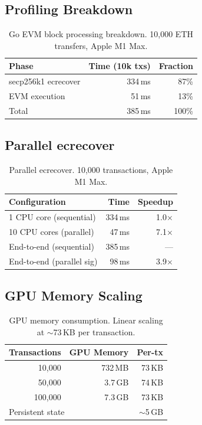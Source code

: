 \subsection{Profiling Breakdown}

\begin{table}[h]
\centering
\small
\begin{tabular}{lrr}
\toprule
\textbf{Phase} & \textbf{Time (10k txs)} & \textbf{Fraction} \\
\midrule
secp256k1 ecrecover & 334\,ms & 87\% \\
EVM execution       & 51\,ms  & 13\% \\
\midrule
Total               & 385\,ms & 100\% \\
\bottomrule
\end{tabular}
\caption{Go EVM block processing breakdown. 10{,}000 ETH transfers, Apple M1 Max.}
\label{tab:profile}
\end{table}

\subsection{Parallel ecrecover}

\begin{table}[h]
\centering
\small
\begin{tabular}{lrr}
\toprule
\textbf{Configuration} & \textbf{Time} & \textbf{Speedup} \\
\midrule
1 CPU core (sequential)  & 334\,ms & 1.0$\times$ \\
10 CPU cores (parallel)  & 47\,ms  & 7.1$\times$ \\
\midrule
End-to-end (sequential)  & 385\,ms & --- \\
End-to-end (parallel sig)& 98\,ms  & 3.9$\times$ \\
\bottomrule
\end{tabular}
\caption{Parallel ecrecover. 10{,}000 transactions, Apple M1 Max.}
\label{tab:ecrecover}
\end{table}

\subsection{GPU Memory Scaling}

\begin{table}[h]
\centering
\small
\begin{tabular}{rrr}
\toprule
\textbf{Transactions} & \textbf{GPU Memory} & \textbf{Per-tx} \\
\midrule
10{,}000  & 732\,MB  & 73\,KB \\
50{,}000  & 3.7\,GB  & 74\,KB \\
100{,}000 & 7.3\,GB  & 73\,KB \\
\midrule
\multicolumn{2}{l}{Persistent state} & $\sim$5\,GB \\
\bottomrule
\end{tabular}
\caption{GPU memory consumption. Linear scaling at $\sim$73\,KB per transaction.}
\label{tab:memory}
\end{table}

